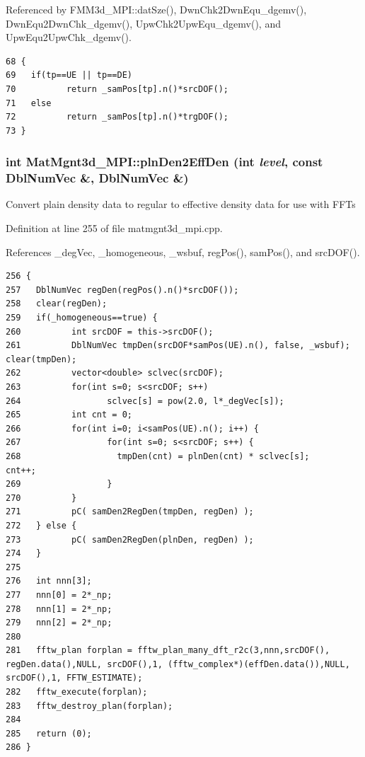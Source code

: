 Referenced by FMM3d\_\-MPI::dat\-Sze(), Dwn\-Chk2Dwn\-Equ\_\-dgemv(), Dwn\-Equ2Dwn\-Chk\_\-dgemv(), Upw\-Chk2Upw\-Equ\_\-dgemv(), and Upw\-Equ2Upw\-Chk\_\-dgemv().

\footnotesize\begin{verbatim}68 {
69   if(tp==UE || tp==DE)
70          return _samPos[tp].n()*srcDOF();
71   else
72          return _samPos[tp].n()*trgDOF();
73 }
\end{verbatim}\normalsize 


\subsubsection{\setlength{\rightskip}{0pt plus 5cm}int Mat\-Mgnt3d\_\-MPI::pln\-Den2Eff\-Den (int {\em level}, const Dbl\-Num\-Vec \&, Dbl\-Num\-Vec \&)}\label{classMatMgnt3d__MPI_401736fd8ff6ae54a15badf8b0a91e33_401736fd8ff6ae54a15badf8b0a91e33}


Convert plain density data to regular to effective density data for use with FFTs 

Definition at line 255 of file matmgnt3d\_\-mpi.cpp.

References \_\-deg\-Vec, \_\-homogeneous, \_\-wsbuf, reg\-Pos(), sam\-Pos(), and src\-DOF().

\footnotesize\begin{verbatim}256 {
257   DblNumVec regDen(regPos().n()*srcDOF());
258   clear(regDen);
259   if(_homogeneous==true) {
260          int srcDOF = this->srcDOF();
261          DblNumVec tmpDen(srcDOF*samPos(UE).n(), false, _wsbuf);         clear(tmpDen);
262          vector<double> sclvec(srcDOF);
263          for(int s=0; s<srcDOF; s++)
264                 sclvec[s] = pow(2.0, l*_degVec[s]);
265          int cnt = 0;
266          for(int i=0; i<samPos(UE).n(); i++) {
267                 for(int s=0; s<srcDOF; s++) {
268                   tmpDen(cnt) = plnDen(cnt) * sclvec[s];                  cnt++;
269                 }
270          }
271          pC( samDen2RegDen(tmpDen, regDen) );
272   } else {
273          pC( samDen2RegDen(plnDen, regDen) );
274   }
275   
276   int nnn[3];
277   nnn[0] = 2*_np;
278   nnn[1] = 2*_np;
279   nnn[2] = 2*_np;
280 
281   fftw_plan forplan = fftw_plan_many_dft_r2c(3,nnn,srcDOF(), regDen.data(),NULL, srcDOF(),1, (fftw_complex*)(effDen.data()),NULL, srcDOF(),1, FFTW_ESTIMATE);
282   fftw_execute(forplan);
283   fftw_destroy_plan(forplan);  
284   
285   return (0);
286 }
\end{verbatim}\normalsize 


